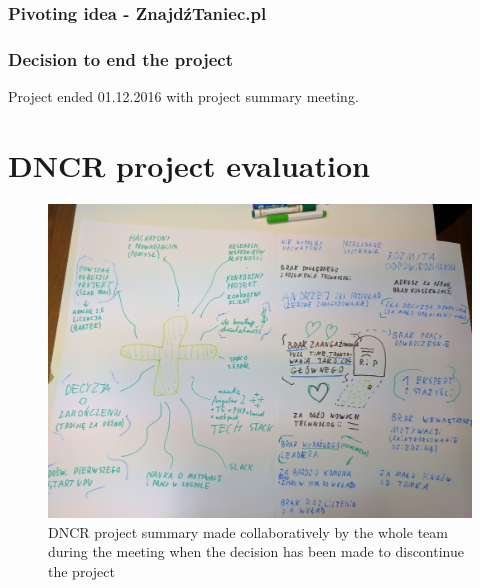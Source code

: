 \documentclass{article}
\begin{document}
\subsubsection{Pivoting idea - ZnajdźTaniec.pl}

\subsubsection{Decision to end the project}
Project ended 01.12.2016 with project summary meeting.

\section{DNCR project evaluation}
\begin{figure}[h]
    \includegraphics[width=\textwidth]{dncr-funeral}
    \caption{DNCR project summary made collaboratively by the whole team during the meeting when the decision has been made to discontinue the project}
    \label{fig:dncr-funeral}
\end{figure}
\FloatBarrier
\end{document}
